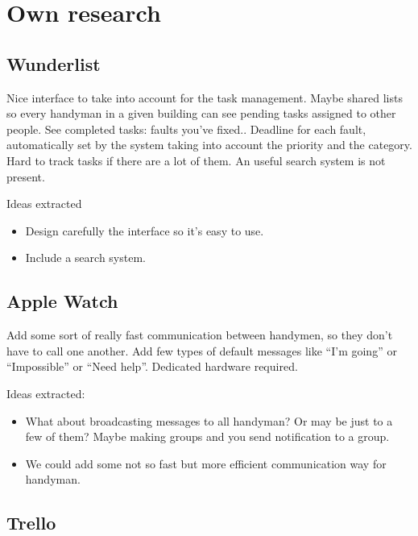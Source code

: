 \section{Own research}

\subsection{Wunderlist}

\begin{itemize}
\adv Nice interface to take into account for the task management.
\adv Maybe shared lists so every handyman in a given building can see pending tasks assigned to other people.
\adv See completed tasks: faults you've fixed..
\adv Deadline for each fault, automatically set by the system taking into account the priority and the category.
\dsv Hard to track tasks if there are a lot of them.
\dsv An useful search system is not present.
\end{itemize}

Ideas extracted

\begin{itemize}
\item Design carefully the interface so it's easy to use.
\item Include a search system.
\end{itemize}

\subsection{Apple Watch}

\begin{itemize}
\adv Add some sort of really fast communication between handymen, so they don't have to call one another.
\adv Add few types of default messages like “I'm going” or “Impossible” or “Need help”.
\dsv Dedicated hardware required.
\end{itemize}

Ideas extracted:

\begin{itemize}\label{AppleWatch}
\item What about broadcasting messages to all handyman? Or may be just to a few of them? Maybe making groups and you send notification to a group.
\item We could add some not so fast but more efficient communication way for handyman.
\end{itemize}

\subsection{Trello}

